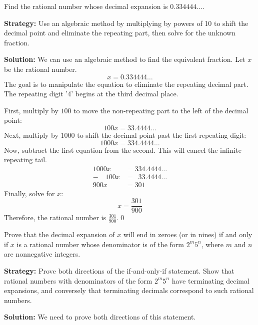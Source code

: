 \begin{problembox}
\begin{problemstatement}
Find the rational number whose decimal expansion is $0.334444\ldots$.
\end{problemstatement}
\end{problembox}

\noindent\textbf{Strategy:} Use an algebraic method by multiplying by powers of 10 to shift the decimal point and eliminate the repeating part, then solve for the unknown fraction.

\bigskip\noindent\textbf{Solution:}
We can use an algebraic method to find the equivalent fraction. Let $x$ be the rational number.
$$x = 0.334444\ldots$$
The goal is to manipulate the equation to eliminate the repeating decimal part. The repeating digit '4' begins at the third decimal place.

First, multiply by $100$ to move the non-repeating part to the left of the decimal point:
$$100x = 33.4444\ldots$$
Next, multiply by $1000$ to shift the decimal point past the first repeating digit:
$$1000x = 334.4444\ldots$$
Now, subtract the first equation from the second. This will cancel the infinite repeating tail.
\begin{align*}
1000x &= 334.4444\ldots \\
-\quad 100x &= \phantom{0}33.4444\ldots \\
\hline
900x &= 301
\end{align*}
Finally, solve for $x$:
$$x = \frac{301}{900}$$
Therefore, the rational number is \textbf{$\frac{301}{900}$}.\qed



\begin{problembox}
\begin{problemstatement}
Prove that the decimal expansion of $x$ will end in zeroes (or in nines) if and only if $x$ is a rational number whose denominator is of the form $2^m 5^n$, where $m$ and $n$ are nonnegative integers.
\end{problemstatement}
\end{problembox}

\noindent\textbf{Strategy:} Prove both directions of the if-and-only-if statement. Show that rational numbers with denominators of the form $2^m 5^n$ have terminating decimal expansions, and conversely that terminating decimals correspond to such rational numbers.

\bigskip\noindent\textbf{Solution:}
We need to prove both directions of this statement.

